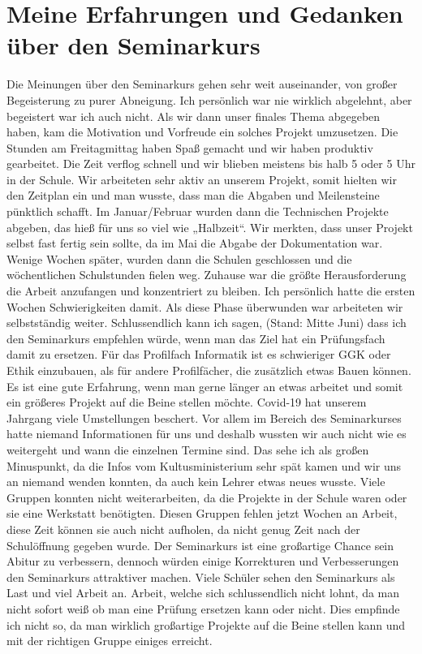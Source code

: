 \documentclass[a4paper, 12pt]{article}
\begin{document}
\section{Meine Erfahrungen und Gedanken über den Seminarkurs}
Die Meinungen über den Seminarkurs gehen sehr weit auseinander, von großer Begeisterung zu purer Abneigung. Ich persönlich war nie wirklich abgelehnt, aber begeistert war ich auch nicht. Als wir dann unser finales Thema abgegeben haben, kam die Motivation und Vorfreude ein solches Projekt umzusetzen. Die Stunden am Freitagmittag haben Spaß gemacht und wir haben produktiv gearbeitet.  Die Zeit verflog schnell und wir blieben meistens bis halb 5 oder 5 Uhr in der Schule. Wir arbeiteten sehr aktiv an unserem Projekt, somit hielten wir den Zeitplan ein und man wusste, dass man die Abgaben und Meilensteine pünktlich schafft.
Im Januar/Februar wurden dann die Technischen Projekte abgeben, das hieß für uns so viel wie „Halbzeit“. Wir merkten, dass unser Projekt selbst fast fertig sein sollte, da im Mai die Abgabe der Dokumentation war. 
Wenige Wochen später, wurden dann die Schulen geschlossen und die wöchentlichen Schulstunden fielen weg. Zuhause war die größte Herausforderung die Arbeit anzufangen und konzentriert zu bleiben. Ich persönlich hatte die ersten Wochen Schwierigkeiten damit. Als diese Phase überwunden war arbeiteten wir selbstständig weiter. 
Schlussendlich kann ich sagen, (Stand: Mitte Juni) dass ich den Seminarkurs empfehlen würde, wenn man das Ziel hat ein Prüfungsfach damit zu ersetzen. Für das Profilfach Informatik ist es schwieriger GGK oder Ethik einzubauen, als für andere Profilfächer, die zusätzlich etwas Bauen können. Es ist eine gute Erfahrung, wenn man gerne länger an etwas arbeitet und somit ein größeres Projekt auf die Beine stellen möchte. 
Covid-19 hat unserem Jahrgang viele Umstellungen beschert. Vor allem im Bereich des Seminarkurses hatte niemand Informationen für uns und deshalb wussten wir auch nicht wie es weitergeht und wann die einzelnen Termine sind. Das sehe ich als großen Minuspunkt, da die Infos vom Kultusministerium sehr spät kamen und wir uns an niemand wenden konnten, da auch kein Lehrer etwas neues wusste. 
Viele Gruppen konnten nicht weiterarbeiten, da die Projekte in der Schule waren oder sie eine Werkstatt benötigten. Diesen Gruppen fehlen jetzt Wochen an Arbeit, diese Zeit können sie auch nicht aufholen, da nicht genug Zeit nach der Schulöffnung gegeben wurde. 
Der Seminarkurs ist eine großartige Chance sein Abitur zu verbessern, dennoch würden einige Korrekturen und Verbesserungen den Seminarkurs attraktiver machen. Viele Schüler sehen den Seminarkurs als Last und viel Arbeit an. Arbeit, welche sich schlussendlich nicht lohnt, da man nicht sofort weiß ob man eine Prüfung ersetzen kann oder nicht. Dies empfinde ich nicht so, da man wirklich großartige Projekte auf die Beine stellen kann und mit der richtigen Gruppe einiges erreicht. 
\end{document}
